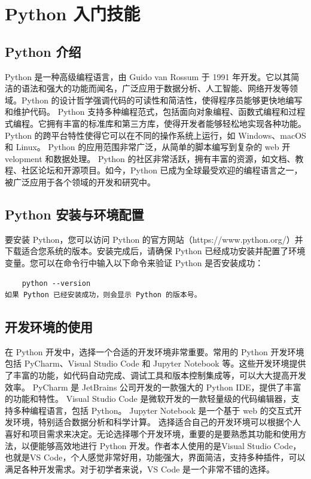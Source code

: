 \section{Python 入门技能}
\subsection{Python 介绍}
Python 是一种高级编程语言，由 Guido van Rossum 于 1991 年开发。它以其简洁的语法和强大的功能而闻名，广泛应用于数据分析、人工智能、网络开发等领域。Python 的设计哲学强调代码的可读性和简洁性，使得程序员能够更快地编写和维护代码。
Python 支持多种编程范式，包括面向对象编程、函数式编程和过程式编程。它拥有丰富的标准库和第三方库，使得开发者能够轻松地实现各种功能。Python 的跨平台特性使得它可以在不同的操作系统上运行，如 Windows、macOS 和 Linux。
Python 的应用范围非常广泛，从简单的脚本编写到复杂的 web 开velopment 和数据处理。 Python 的社区非常活跃，拥有丰富的资源，如文档、教程、社区论坛和开源项目。如今，Python 已成为全球最受欢迎的编程语言之一，被广泛应用于各个领域的开发和研究中。



\subsection{Python 安装与环境配置}
要安装 Python，您可以访问 Python 的官方网站（https://www.python.org/）并下载适合您系统的版本。安装完成后，请确保 Python 已经成功安装并配置了环境变量。您可以在命令行中输入以下命令来验证 Python 是否安装成功：
\begin{lstlisting}
    python --version    
如果 Python 已经安装成功，则会显示 Python 的版本号。
\end{lstlisting}


\subsection{开发环境的使用}
在 Python 开发中，选择一个合适的开发环境非常重要。常用的 Python 开发环境包括 PyCharm、Visual Studio Code 和 Jupyter Notebook 等。这些开发环境提供了丰富的功能，如代码自动完成、调试工具和版本控制集成等，可以大大提高开发效率。
PyCharm 是 JetBrains 公司开发的一款强大的 Python IDE，提供了丰富的功能和特性。 Visual Studio Code 是微软开发的一款轻量级的代码编辑器，支持多种编程语言，包括 Python。 Jupyter Notebook 是一个基于 web 的交互式开发环境，特别适合数据分析和科学计算。
选择适合自己的开发环境可以根据个人喜好和项目需求来决定。无论选择哪个开发环境，重要的是要熟悉其功能和使用方法，以便能够高效地进行 Python 开发。作者本人使用的是Visual Studio Code，也就是VS Code，个人感觉非常好用，功能强大，界面简洁，支持多种插件，可以满足各种开发需求。对于初学者来说，VS Code 是一个非常不错的选择。



